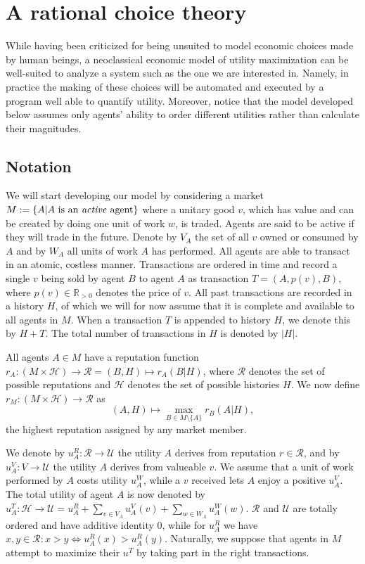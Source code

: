 \chapter{A rational choice theory}
While having been criticized for being unsuited to model economic choices made by human beings, 
a neoclassical economic model of utility maximization can be well-suited to analyze a system such as the one we are interested in. 
Namely, in practice the making of these choices will be automated and executed by a program well able to quantify utility. 
Moreover, notice that the model developed below assumes only agents' ability to order different utilities rather than calculate their magnitudes.

\section{Notation}\label{section:model_notation}
We will start developing our model by considering a market $M := \{ A | A \ \text{is an \emph{active} agent} \}$ where a unitary good $v$, 
which has value and can be created by doing one unit of work $w$, is traded. 
Agents are said to be active if they will trade in the future. 
Denote by $V_A$ the set of all $v$ owned or consumed by $A$ and by $W_A$ all units of work $A$ has performed. 
All agents are able to transact in an atomic, costless manner. 
Transactions are ordered in time and record a single $v$ being sold by agent $B$ to agent $A$ as transaction $T = (A, p(v), B)$, 
where $p(v) \in \mathds{R}_{>0}$ denotes the price of $v$. 
All past transactions are recorded in a history $H$, 
of which we will for now assume that it is complete and available to all agents in $M$. 
When a transaction $T$ is appended to history $H$, 
we denote this by $H + T$. 
The total number of transactions in $H$ is denoted by $|H|$.

All agents $A \in M$ have a reputation function $r_A: (M \times \mathcal{H}) \to \mathcal{R} = (B, H) \mapsto r_A(B | H)$, 
where $\mathcal{R}$ denotes the set of possible reputations and $\mathcal{H}$ denotes the set of possible histories $H$. 
We now define $r_M: (M \times \mathcal{H}) \to \mathcal{R}$ as
\[(A, H) \mapsto \max_{B \in M \setminus \{ A \}} r_B(A | H),\]
the highest reputation assigned by any market member.

We denote by $u^R_A: \mathcal{R} \to \mathcal{U}$ the utility $A$ derives from reputation $r \in \mathcal{R}$, 
and by $u^V_A: V \to \mathcal{U}$ the utility $A$ derives from valueable $v$. 
We assume that a unit of work performed by $A$ costs utility $u^W_A$, 
while a $v$ received lets $A$ enjoy a positive $u^V_A$. 
The total utility of agent $A$ is now denoted by $u^T_A: \mathcal{H} \to \mathcal{U} = u^R_A + \sum_{v \in V_A} u^V_A(v) + \sum_{w \in W_A} u^W_A(w)$. 
$\mathcal{R}$ and $\mathcal{U}$ are totally ordered and have additive identity $0$, 
while for $u^R_A$ we have $x, y \in \mathcal{R}: x > y \Leftrightarrow u^R_A(x) > u^R_A(y)$. 
Naturally, we suppose that agents in $M$ attempt to maximize their $u^T$ by taking part in the right transactions.

